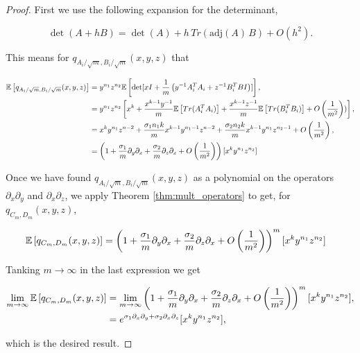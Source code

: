     \begin{proof}
        First we use the following expansion for the determinant,

        \begin{equation*}
            \det( { A} + h { B} ) = \det({ A})  + h \, Tr \left( \mbox{adj} ({A}) \, { B} \right) + O \left(h^2\right).
        \end{equation*}

        This means for $q_{A_i/\sqrt m, B_i/\sqrt m}(x,y,z)$ that

        \begin{align*}
            \mathbb E \left[ q_{A_i/\sqrt m, B_i/\sqrt m}(x,y,z) \right] &= y^{n_1}z^{n_2}\mathbb E \left[  \det[ xI + \frac{1}{m}\left( y^{-1}A^T_i A_i + z^{-1}B^T_i BI \right) ]  \right], \\ 
            &= y^{n_1}z^{n_2}\left[ x^k + \frac{x^{k-1}y^{-1}}{m}\mathbb E \left[ Tr(A^T_iA_i) \right] + \frac{x^{k-1}z^{-1}}{m}\mathbb E \left[ Tr(B^T_i B_i) \right] + O\left(\frac{1}{m^2}\right))\right],\\ 
            &= x^k y^{n_1}z^{n-2} + \frac{\sigma_1 n_1 k}{m}x^{k-1}y^{n_1-1}z^{n-2} + \frac{\sigma_2 n_2 k}{m}x^{k-1}y^{n_1}z^{n_2-1} + O \left(\frac{1}{m^2}\right), \\
            &= \left( 1 + \frac{\sigma_1}{m}\partial_y\partial_x + \frac{\sigma_2}{m}\partial_z\partial_x + O \left(\frac{1}{m^2}\right)\right)[x^k y^{n_1} z^{n_2}]
        \end{align*}

    Once we have found $q_{A_i/\sqrt m, B_i/\sqrt{m}}(x,y,z)$ as a polynomial on the operators $\partial_x \partial_y$ and $\partial_x \partial_z$, we apply Theorem \ref{thm:mult_operators} to get, for $q_{C_m,D_m}(x,y,z)$,

    \begin{align*}
        \mathbb E \left[  q_{C_m,D_m}(x,y,z)  \right] &= \left( 1 + \frac{\sigma_1}{m}\partial_y\partial_x + \frac{\sigma_2}{m}\partial_z\partial_x + O \left(\frac{1}{m^2}\right)\right)^m[x^k y^{n_1} z^{n_2}]
    \end{align*}

    Tanking $m\to \infty$ in the last expression we get

    \begin{align*}
        \lim_{m\to\infty} \mathbb E \left[ q_{C_m,D_m}(x,y,z) \right] &= \lim_{m\to\infty} \left( 1 + \frac{\sigma_1}{m}\partial_y\partial_x + \frac{\sigma_2}{m}\partial_z\partial_x + O \left(\frac{1}{m^2}\right)\right)^m[x^k y^{n_1} z^{n_2}],\\
        &= e^{\sigma_1 \partial_x\partial_y + \sigma_2 \partial_x \partial_z}[x^k y^{n_1}z^{n_2}],
    \end{align*}

    \noindent which is the desired result.
    \end{proof}

